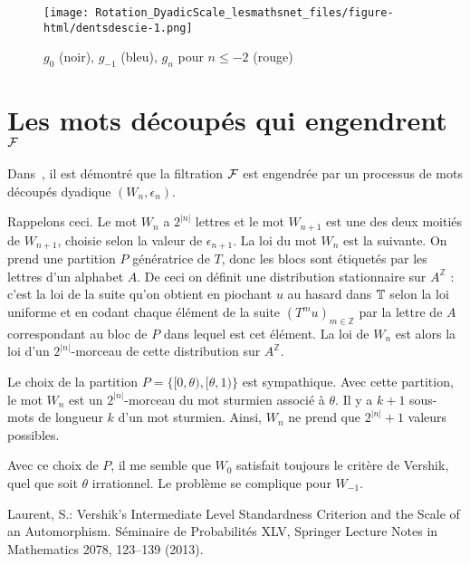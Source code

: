 \documentclass[12pt,a4paper]{article}
\begin{document}
\begin{figure}[!h]
\centering
\texttt{[image: Rotation\_DyadicScale\_lesmathsnet\_files/figure-html/dentsdescie-1.png]} 
\caption{$g_0$ (noir), $g_{-1}$ (bleu), $g_n$ pour $n \leq -2$ (rouge)}
\end{figure}


\section{Les mots découpés qui engendrent $\mathcal{F}$} 

Dans~\cite{LauXLV}, il est démontré que 
la filtration $\mathcal{F}$ est engendrée par un processus de mots 
découpés dyadique $(W_n, \epsilon_n)$. 

Rappelons ceci. 
Le mot $W_n$ a $2^{|n|}$ lettres et le mot $W_{n+1}$ est une des deux 
moitiés de $W_{n+1}$, choisie selon la valeur de $\epsilon_{n+1}$. 
La loi du mot $W_n$ est la suivante. 
On prend une partition $P$ génératrice de $T$, 
donc les blocs sont étiquetés par les lettres d'un alphabet $A$. 
De ceci on définit une distribution stationnaire sur $A^{\mathbb{Z}}$ : 
c'est la loi de la suite qu'on obtient en piochant $u$ au hasard dans $\mathbb{T}$ 
selon la loi uniforme et en codant chaque élément de la suite 
$(T^mu)_{m \in \mathbb{Z}}$ par la lettre de $A$ correspondant au bloc de 
$P$ dans lequel est cet élément. 
La loi de $W_n$ est alors la loi d'un $2^{|n|}$-morceau de cette distribution sur $A^{\mathbb{Z}}$.

Le choix de la partition $P = \bigl\{[0,\theta), [\theta,1)\bigr\}$ est 
sympathique. 
Avec cette partition, le mot $W_n$ est un $2^{|n|}$-morceau du mot sturmien 
associé à $\theta$. 
Il y a $k+1$ sous-mots de longueur $k$ d'un mot sturmien. 
Ainsi, $W_n$ ne prend que $2^{|n|}+1$ valeurs possibles.

Avec ce choix de $P$, il me semble que $W_0$ satisfait toujours le 
critère de Vershik, quel que soit $\theta$ irrationnel. 
Le problème se complique pour $W_{-1}$. 





\begin{thebibliography}{99.}


Laurent, S.: 
Vershik's Intermediate Level Standardness Criterion and the Scale of an Automorphism. 
S\'eminaire de Probabilit\'es XLV,
Springer Lecture Notes in Mathematics 2078,
123--139 (2013).


\end{thebibliography}

 
\end{document}
